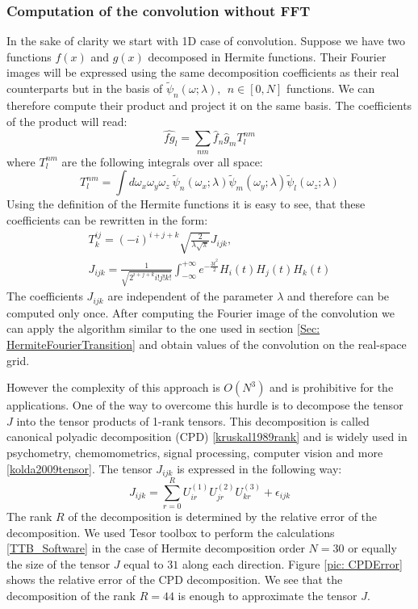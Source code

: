 \subsubsection{Computation of the convolution without FFT}
In the sake of clarity we start with 1D case of convolution.
Suppose we have two functions $f(x)$ and $g(x)$ decomposed in Hermite functions. Their Fourier images will be expressed using the same decomposition coefficients as their real counterparts
but in the basis of $\tilde{\psi}_n(\omega; \lambda), ~~n\in[0,N]$ functions. We can therefore compute their product and project it on the same basis. The coefficients of the product will read:
\begin{equation}
 \hat{fg}_l=\sum_{nm}\hat{f}_n \hat{g}_m T^{nm}_l
\end{equation}
where $T^{nm}_l$ are the following integrals over all space:
\begin{equation}
 T^{nm}_l = \int d\omega_x\omega_y\omega_z~ \tilde{\psi}_n(\omega_x; \lambda)\tilde{\psi}_m(\omega_y; \lambda)\tilde{\psi}_l(\omega_z; \lambda)
\end{equation}
Using the definition of the Hermite functions it is easy to see, that these coefficients can be rewritten in the form:
\begin{eqnarray*}
 T^{ij}_k = (-i)^{i+j+k}\sqrt{\frac{2}{\lambda \sqrt{\pi}}}J_{ijk},\\
 J_{ijk}=\frac{1}{\sqrt{2^{i+j+k} i!j!k!}}\int_{-\infty}^{+\infty}e^{-\frac{3t^2}{2}}H_i(t)H_j(t)H_k(t)
\end{eqnarray*}
The coefficients $J_{ijk}$ are independent of the parameter $\lambda$ and therefore can be computed only once. After computing the Fourier image of
the convolution we can apply the algorithm similar to the one used in section \ref{Sec: HermiteFourierTransition} and obtain values of the convolution 
on the real-space grid.

However the complexity of this approach is $O(N^3)$ and is prohibitive for the applications. One of the way to overcome this hurdle is to decompose 
the tensor $J$ into the tensor products of 1-rank tensors. This decomposition is called canonical polyadic decomposition (CPD) \ref{kruskal1989rank} and is widely used in
psychometry, chemomometrics, signal processing, computer vision and more \ref{kolda2009tensor}. The tensor $J_{ijk}$ is expressed in the following way:
\begin{equation}
 J_{ijk} = \sum_{r=0}^{R} U^{(1)}_{ir} U^{(2)}_{jr} U^{(3)}_{kr} + \epsilon_{ijk}
\end{equation}
The rank $R$ of the decomposition is determined by the relative error of the decomposition. We used Tesor toolbox to perform the calculations \ref{TTB_Software} in the 
case of Hermite decomposition order $N=30$ or equally the size of the tensor $J$ equal to $31$ along each direction.
Figure \ref{pic: CPDError} shows the relative error of the CPD decomposition. We see that the decomposition of the rank $R=44$ is enough to approximate the 
tensor $J$.

